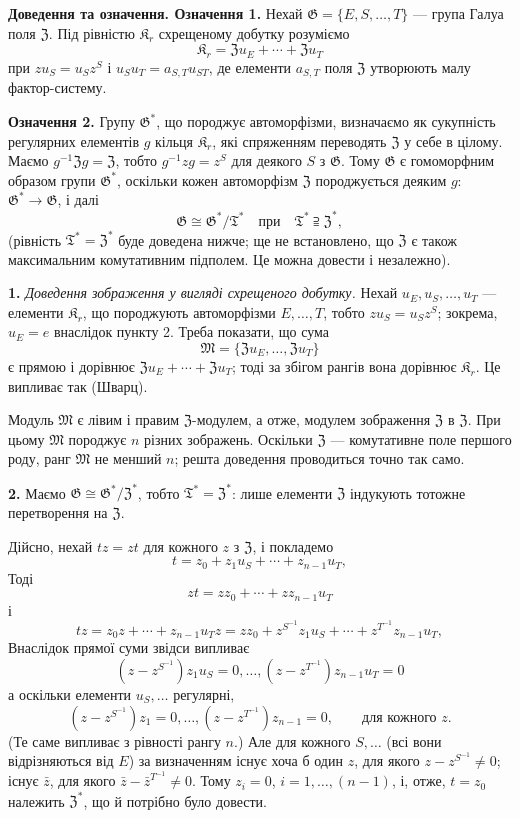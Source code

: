 \documentclass[11pt]{article}
\begin{document}
\noindent\textbf{Доведення та означення. Означення 1.} Нехай \(\mathfrak G=\{E,S,\ldots,T\}\) --- група Галуа поля \(\mathfrak Z\). Під рівністю \(\mathfrak K_r\) схрещеному добутку розуміємо
\[
\mathfrak K_r=\mathfrak Zu_E+\cdots+\mathfrak Zu_T
\]
при \(zu_S=u_Sz^S\) і \(u_Su_T=a_{S,T}u_{ST}\), де елементи \(a_{S,T}\) поля \(\mathfrak Z\) утворюють малу фактор-систему.

\noindent\textbf{Означення 2.} Групу \(\mathfrak G^*\), що породжує автоморфізми, визначаємо як сукупність регулярних елементів \(g\) кільця \(\mathfrak K_r\), які спряженням переводять \(\mathfrak Z\) у себе в цілому. Маємо \(g^{-1}\mathfrak Zg=\mathfrak Z\), тобто \(g^{-1}zg=z^S\) для деякого \(S\) з \(\mathfrak G\). Тому \(\mathfrak G\) є гомоморфним образом групи \(\mathfrak G^*\), оскільки кожен автоморфізм \(\mathfrak Z\) породжується деяким \(g\): \(\mathfrak G^*\to\mathfrak G\), і далі
\[
\mathfrak G\cong\mathfrak G^*/\mathfrak T^*
\quad\text{при}\quad
\mathfrak T^*\supseteqq\mathfrak Z^*,
\]
(рівність \(\mathfrak T^*=\mathfrak Z^*\) буде доведена нижче; ще не встановлено, що \(\mathfrak Z\) є також максимальним комутативним підполем. Це можна довести і незалежно).

\noindent\textbf{1.} \emph{Доведення зображення у вигляді схрещеного добутку.} Нехай \(u_E,u_S,\ldots,u_T\) --- елементи \(\mathfrak K_r\), що породжують автоморфізми \(E,\ldots,T\), тобто \(zu_S=u_Sz^S\); зокрема, \(u_E=e\) внаслідок пункту 2. Треба показати, що сума
\[
\mathfrak M=\{\mathfrak Zu_E,\ldots,\mathfrak Zu_T\}
\]
є прямою і дорівнює \(\mathfrak Zu_E+\cdots+\mathfrak Zu_T\); тоді за збігом рангів вона дорівнює \(\mathfrak K_r\). Це випливає так (Шварц).

Модуль \(\mathfrak M\) є лівим і правим \(\mathfrak Z\)-модулем, а отже, модулем зображення \(\mathfrak Z\) в \(\mathfrak Z\). При цьому \(\mathfrak M\) породжує \(n\) різних зображень. Оскільки \(\mathfrak Z\) --- комутативне поле першого роду, ранг \(\mathfrak M\) не менший \(n\); решта доведення проводиться точно так само.

\noindent\textbf{2.} Маємо \(\mathfrak G\cong\mathfrak G^*/\mathfrak Z^*\), тобто \(\mathfrak T^*=\mathfrak Z^*\): лише елементи \(\mathfrak Z\) індукують тотожне перетворення на \(\mathfrak Z\).

Дійсно, нехай \(tz=zt\) для кожного \(z\) з \(\mathfrak Z\), і покладемо
\[
t=z_0+z_1u_S+\cdots+z_{n-1}u_T,
\]
Тоді
\[
zt=zz_0+\cdots+zz_{n-1}u_T
\]
і
\[
tz=z_0z+\cdots+z_{n-1}u_Tz
=zz_0+z^{S^{-1}}z_1u_S+\cdots+z^{T^{-1}}z_{n-1}u_T,
\]
Внаслідок прямої суми звідси випливає
\[
(z-z^{S^{-1}})z_1u_S=0,\ldots,
(z-z^{T^{-1}})z_{n-1}u_T=0
\]
а оскільки елементи \(u_S,\ldots\) регулярні,
\[
(z-z^{S^{-1}})z_1=0,\ldots,
(z-z^{T^{-1}})z_{n-1}=0,
\qquad\text{для кожного }z.
\]
(Те саме випливає з рівності рангу \(n\).) Але для кожного \(S,\ldots\) (всі вони відрізняються від \(E\)) за визначенням існує хоча б один \(z\), для якого \(z-z^{S^{-1}}\neq0\); існує \(\bar z\), для якого \(\bar z-\bar z^{T^{-1}}\neq0\). Тому \(z_i=0\), \(i=1,\ldots,(n-1)\), і, отже, \(t=z_0\) належить \(\mathfrak Z^*\), що й потрібно було довести.
\end{document}
